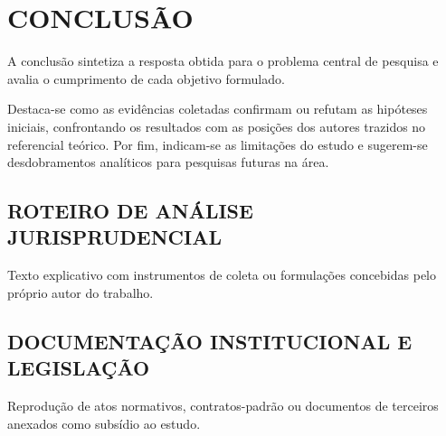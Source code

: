 \documentclass[
    12pt,               %
    openright,          %
    oneside,            %
    a4paper,            %
    english,            %
    brazil              %
]{abntex2}
\begin{document}
\chapter{CONCLUSÃO}
\label{cap:conclusao}

A conclusão sintetiza a resposta obtida para o problema central de pesquisa e avalia o cumprimento de cada objetivo formulado.

Destaca-se como as evidências coletadas confirmam ou refutam as hipóteses iniciais, confrontando os resultados com as posições dos autores trazidos no referencial teórico. Por fim, indicam-se as limitações do estudo e sugerem-se desdobramentos analíticos para pesquisas futuras na área.

\postextual



\begin{apendicesenv}
\partapendices

\chapter{ROTEIRO DE ANÁLISE JURISPRUDENCIAL}
Texto explicativo com instrumentos de coleta ou formulações concebidas pelo próprio autor do trabalho.

\end{apendicesenv}

\begin{anexosenv}
\partanexos

\chapter{DOCUMENTAÇÃO INSTITUCIONAL E LEGISLAÇÃO}
Reprodução de atos normativos, contratos-padrão ou documentos de terceiros anexados como subsídio ao estudo.

\end{anexosenv}
\end{document}
